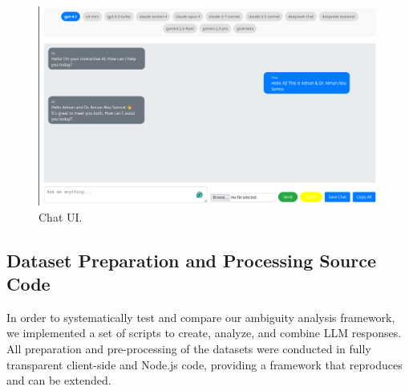 \documentclass[11pt,a4paper]{article}
\begin{document}
\begin{figure}[!t]
\centering
\includegraphics[width=\columnwidth]{images/Figure2.jpeg}
\caption{Chat UI.}
\label{fig_chatui}
\end{figure}


\subsection{Dataset Preparation and Processing Source Code}
In order to systematically test and compare our ambiguity analysis framework, we implemented a set of scripts to create, analyze, and combine LLM responses. All preparation and pre-processing of the datasets were conducted in fully transparent client-side and Node.js code, providing a framework that reproduces and can be extended.
\end{document}
